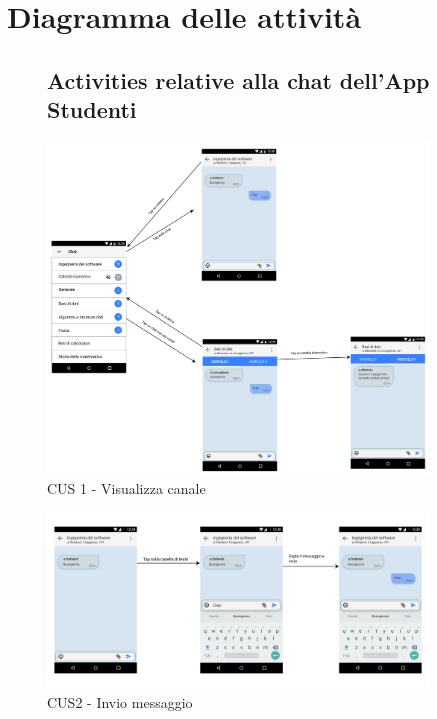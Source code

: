 \section{Diagramma delle attività}
\begin{figure}
\subsection{Activities relative alla chat dell'App Studenti}
	\centering
	\includegraphics[width=0.9\textwidth]{imgs/gruppo6/activities/act_cus1_visualizza_canale.pdf}
	\caption{CUS 1 - Visualizza canale}
	\label{fig:cus1}
\end{figure}

\begin{figure}
	\centering
	\includegraphics[width=0.9\textwidth]{imgs/gruppo6/activities/act_cus2_invio_messaggio.pdf}
	\caption{CUS2 - Invio messaggio}
	\label{fig:cus2}
\end{figure}

